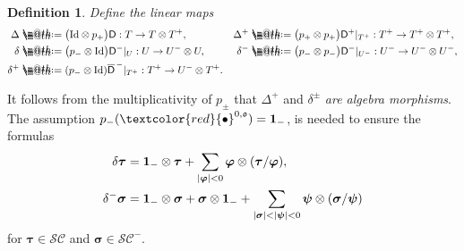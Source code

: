 \documentclass[10pt, reqno]{amsart}
\makeatletter
\numberwithin{subsection}{section}
\numberwithin{subsubsection}{subsection}
\numberwithin{equation}{section} %
\theoremstyle{mystyle}
\theoremstyle{mystyle2}
\newtheorem*{defn*} {Definition}
\theoremstyle{mystyle3}
\newcommand{\bstau}{\boldsymbol{\tau}}
\newcommand{\bssigma}{\boldsymbol{\sigma}}
\newcommand{\bsvarphi}{\boldsymbol{\varphi}}
\newcommand{\mcFsi}{\boldsymbol{\psi}}
\newcommand{\mcI}{\mathcal{I}}
\newcommand*{\defeq}{\mathrel{\rlap{%
                     \raisebox{0.3ex}{$\m@th\cdot$}}%
                     \raisebox{-0.3ex}{$\m@th\cdot$}}%
                     =}
\makeatother
\begin{document}
\begin{defn*}
Define the linear maps
$$
\begin{aligned}
\Delta&\defeq  \big(\text{\rm Id} \otimes p_+\big){\sf D} : T\to T\otimes T^+,
&\Delta^+&\defeq  \big(p_+ \otimes p_+\big){\sf D}^+\vert_{T^+} : T^+ \to T^+ \otimes T^+,\\
\delta &\defeq  \big(p_-\otimes\text{\rm Id}\big){\sf D}^-\vert_U : U \to U^-\otimes U,
&\delta^-& \defeq  \big(p_- \otimes p_-\big){\sf D}^-\vert_{U^-} : U^-\to U^-\otimes U^-,\\
\delta^+ &\defeq  (p_-\otimes\text{\rm Id})\overline{\sf D}^{\,-}\vert_{T^+} : T^+\to U^-\otimes T^+.
\end{aligned}
$$
\end{defn*}

\medskip

It follows from the multiplicativity of $p_\pm$ that $\Delta^+$ and $\delta^\pm$ {\it are algebra morphisms}. The assumption $p_-(\textcolor{red}{\bullet}^{0,\mathfrak{o}})={\bf1}_-$, is needed to ensure the formulas
\begin{align*}
\delta\bstau&={\bf1}_-\otimes\bstau+\sum_{\vert\bsvarphi\vert<0}\bsvarphi\otimes(\bstau/\bsvarphi),\\
\delta^-\bssigma&={\bf1}_-\otimes\bssigma+\bssigma\otimes{\bf1}_- + \sum_{\vert\bssigma\vert<\vert\mcFsi\vert<0}\mcFsi\otimes(\bssigma/\mcFsi)
\end{align*}
for $\bstau\in\mathcal{SC}$ and $\bssigma\in\mathcal{SC}^-$. 

\medskip
\end{document}
